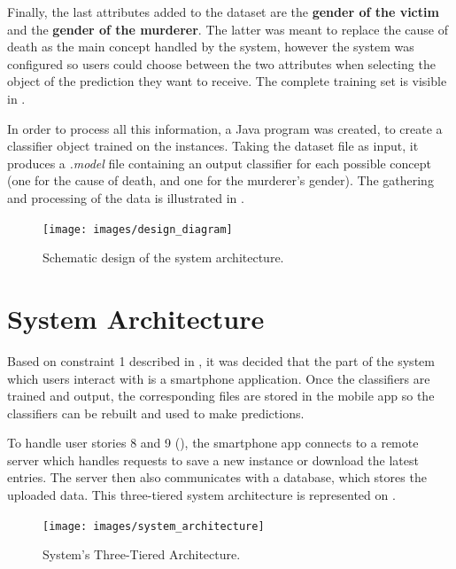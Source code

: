 \documentclass{mproj}
\begin{document}
Finally, the last attributes added to the dataset are the \textbf{gender of the victim} and the \textbf{gender of the murderer}. The latter was meant to replace the cause of death as the main concept handled by the system, however the system was configured so users could choose between the two attributes when selecting the object of the prediction they want to receive. The complete training set is visible in .\par

In order to process all this information, a Java program was created, to create a classifier object trained on the instances. Taking the dataset file as input, it produces a \textit{.model} file containing an output classifier for each possible concept (one for the cause of death, and one for the murderer's gender). The gathering and processing of the data is illustrated in .

\begin{figure}[h]
	\centering
	\texttt{[image: images/design\_diagram]}
	\caption{Schematic design of the system architecture.}
	\label{fig:design}
\end{figure}

\section{System Architecture}

Based on constraint 1 described in , it was decided that the part of the system which users interact with is a smartphone application. Once the classifiers are trained and output, the corresponding files are stored in the mobile app so the classifiers can be rebuilt and used to make predictions.\par

To handle user stories 8 and 9 (), the smartphone app connects to a remote server which handles requests to save a new instance or download the latest entries. The server then also communicates with a database, which stores the uploaded data. This three-tiered system architecture is represented on .

\begin{figure}[h]
	\centering
	\texttt{[image: images/system\_architecture]}
	\caption{System's Three-Tiered Architecture.}
	\label{fig:architecture}
\end{figure}

\end{document}

